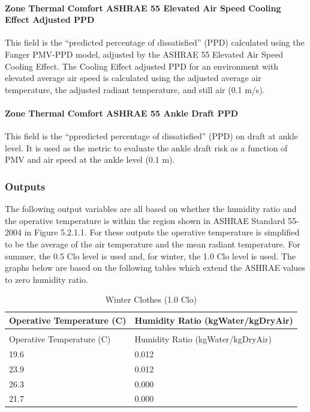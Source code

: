 \paragraph{Zone Thermal Comfort ASHRAE 55 Elevated Air Speed Cooling Effect Adjusted PPD}\label{zone-thermal-comfort-ashrae55-elevated-air-speed-cooling-effect-adjusted-ppd}

This field is the ``predicted percentage of dissatisfied'' (PPD) calculated using the Fanger PMV-PPD model, adjusted by the ASHRAE 55 Elevated Air Speed Cooling Effect. The Cooling Effect adjusted PPD for an environment with elevated average air speed is calculated using the adjusted average air temperature, the adjusted radiant temperature, and still air (0.1 m/s). 

\paragraph{Zone Thermal Comfort ASHRAE 55 Ankle Draft PPD}\label{zone-thermal-comfort-ashrae55-ankle-draft-ppd}

This field is the ``ppredicted percentage of dissatisfied'' (PPD) on draft at ankle level. It is used as the metric to evaluate the ankle draft risk as a function of PMV and air speed at the ankle level (0.1 m). 

\subsubsection{Outputs}\label{outputs-1-014}

The following output variables are all based on whether the humidity ratio and the operative temperature is within the region shown in ASHRAE Standard 55-2004 in Figure 5.2.1.1. For these outputs the operative temperature is simplified to be the average of the air temperature and the mean radiant temperature. For summer, the 0.5 Clo level is used and, for winter, the 1.0 Clo level is used. The graphs below are based on the following tables which extend the ASHRAE values to zero humidity ratio.

\begin{longtable}[c]{@{}ll@{}}
\caption{Winter Clothes (1.0 Clo) \label{table:winter-clothes-1.0-clo}} \tabularnewline
\toprule
Operative Temperature (C) & Humidity Ratio (kgWater/kgDryAir) \tabularnewline
\midrule
\endfirsthead

\caption[]{Winter Clothes (1.0 Clo)} \tabularnewline
\toprule
Operative Temperature (C) & Humidity Ratio (kgWater/kgDryAir) \tabularnewline
\midrule
\endhead

19.6 & 0.012 \tabularnewline
23.9 & 0.012 \tabularnewline
26.3 & 0.000 \tabularnewline
21.7 & 0.000 \tabularnewline
\bottomrule
\end{longtable}

